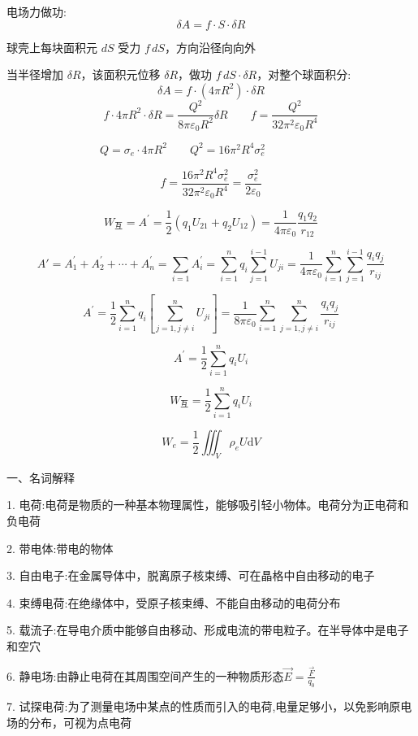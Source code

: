 \documentclass{article}
\begin{document}
电场力做功:
$$\delta A = f \cdot S \cdot \delta R$$

球壳上每块面积元 $ dS $ 受力 $ f \, dS $，方向沿径向向外

当半径增加 $\delta R$，该面积元位移 $\delta R$，做功 $ f \, dS \cdot \delta R $，对整个球面积分:
$$\delta A = f \cdot (4\pi R^2) \cdot \delta R$$
$$f \cdot 4\pi R^2 \cdot \delta R = \frac{Q^2}{8\pi\varepsilon_0 R^2} \delta R\qquad f = \frac{Q^2}{32\pi^2 \varepsilon_0 R^4}$$


$$Q = \sigma_e \cdot 4\pi R^2\qquad Q^2 = 16\pi^2 R^4 \sigma_e^2 \qquad \qquad \quad $$

$$f = \frac{16\pi^2 R^4 \sigma_e^2}{32\pi^2 \varepsilon_0 R^4}= \frac{\sigma_e^2}{2\varepsilon_0}$$

\newpage

$$W_\text{互}=A^{\prime}=\frac{1}{2}(q_1U_{21}+q_2U_{12})=\frac{1}{4\pi\varepsilon_0}\frac{q_1q_2}{r_{12}}$$

$$A'=A_1^{\prime}+A_2^{\prime}+\cdots+A_n^{\prime}=\sum_{i=1}A_i^{\prime}=\sum_{i=1}^nq_i\sum_{j=1}^{i-1}U_{ji}=\frac{1}{4\pi\varepsilon_0}\sum_{i=1}^n\sum_{j=1}^{i-1}\frac{q_iq_j}{r_{ij}}$$

$$A^{\prime}=\frac{1}{2}\sum_{i=1}^nq_i\left[\sum_{j=1,j \neq i}^nU_{ji}\right]=\frac{1}{8\pi\varepsilon_0}\sum_{i=1}^n\sum_{j=1,j \neq i}^n\frac{q_iq_j}{r_{ij}}$$

$$A^{\prime}=\frac{1}{2}\sum_{i=1}^nq_iU_i$$

$$W_\text{互}=\frac{1}{2}\sum_{i=1}^nq_iU_i$$

$$W_e=\frac{1}{2}\iiint_V\rho_eU\mathrm{d}V$$



\newpage



 一、名词解释

 1. 电荷:电荷是物质的一种基本物理属性，能够吸引轻小物体。电荷分为正电荷和负电荷

 2. 带电体:带电的物体

 3. 自由电子:在金属导体中，脱离原子核束缚、可在晶格中自由移动的电子

 4. 束缚电荷:在绝缘体中，受原子核束缚、不能自由移动的电荷分布

 5. 载流子:在导电介质中能够自由移动、形成电流的带电粒子。在半导体中是电子和空穴

 6. 静电场:由静止电荷在其周围空间产生的一种物质形态$ \vec{E} = \frac{\vec{F}}{q_0} $

 7. 试探电荷:为了测量电场中某点的性质而引入的电荷,电量足够小，以免影响原电场的分布，可视为点电荷
\end{document}
